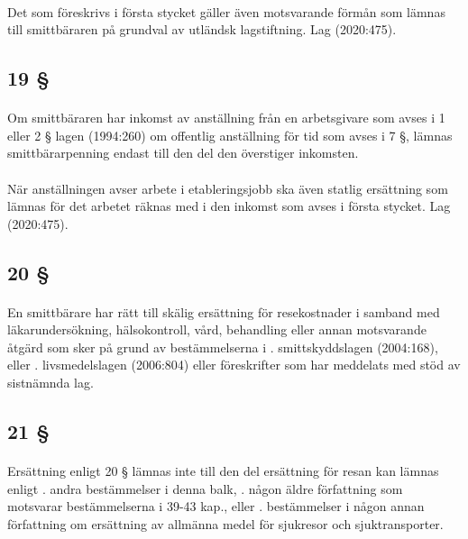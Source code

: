 \documentclass[a4paper,notitlepage,openany,10pt]{book}
\begin{document}
\paragraph*{}
Det som föreskrivs i första stycket gäller även motsvarande förmån som lämnas till smittbäraren på grundval av utländsk lagstiftning.
Lag (2020:475).
\subsection*{19 §}
\paragraph*{}
Om smittbäraren har inkomst av anställning från en arbetsgivare som avses i 1 eller 2 § lagen (1994:260) om offentlig anställning för tid som avses i 7 §, lämnas smittbärarpenning endast till den del den överstiger inkomsten.
\paragraph*{}
När anställningen avser arbete i etableringsjobb ska även statlig ersättning som lämnas för det arbetet räknas med i den inkomst som avses i första stycket.
Lag (2020:475).
\subsection*{20 §}
\paragraph*{}
En smittbärare har rätt till skälig ersättning för resekostnader i samband med läkarundersökning, hälsokontroll, vård, behandling eller annan motsvarande åtgärd som sker på grund av bestämmelserna i
. smittskyddslagen (2004:168), eller
. livsmedelslagen (2006:804) eller föreskrifter som har meddelats med stöd av sistnämnda lag.
\subsection*{21 §}
\paragraph*{}
Ersättning enligt 20 § lämnas inte till den del ersättning för resan kan lämnas enligt
. andra bestämmelser i denna balk,
. någon äldre författning som motsvarar bestämmelserna i 39-43 kap., eller
. bestämmelser i någon annan författning om ersättning av allmänna medel för sjukresor och sjuktransporter.
\end{document}
